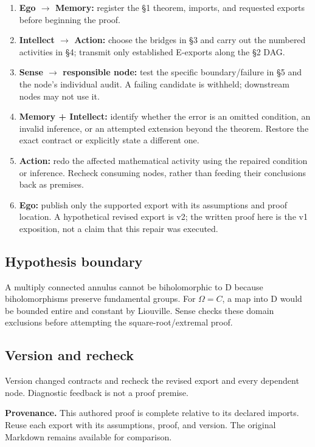 \documentclass[preprint,12pt,aps,pra,showkeys,amsmath,amssymb,superscriptaddress,floatfix]{revtex4-2}
\theoremstyle{definition}
\theoremstyle{remark}
\providecommand{\tightlist}{\setlength{\itemsep}{2pt}\setlength{\parskip}{0pt}}
\begin{document}
\begin{enumerate}
\def\labelenumi{\arabic{enumi}.}
\tightlist
\item
  \textbf{Ego \(\to\) Memory:} register the §1 theorem, imports, and
  requested exports before beginning the proof.
\item
  \textbf{Intellect \(\to\) Action:} choose the bridges in §3 and carry
  out the numbered activities in §4; transmit only established E-exports
  along the §2 DAG.
\item
  \textbf{Sense \(\to\) responsible node:} test the specific
  boundary/failure in §5 and the node's individual audit. A failing
  candidate is withheld; downstream nodes may not use it.
\item
  \textbf{Memory + Intellect:} identify whether the error is an omitted
  condition, an invalid inference, or an attempted extension beyond the
  theorem. Restore the exact contract or explicitly state a different
  one.
\item
  \textbf{Action:} redo the affected mathematical activity using the
  repaired condition or inference. Recheck consuming nodes, rather than
  feeding their conclusions back as premises.
\item
  \textbf{Ego:} publish only the supported export with its assumptions
  and proof location. A hypothetical revised export is v2; the written
  proof here is the v1 exposition, not a claim that this repair was
  executed.
\end{enumerate}

\subsection{Hypothesis boundary}
A multiply connected annulus cannot be biholomorphic to D because
biholomorphisms preserve fundamental groups. For \(\Omega =C\), a map
into D would be bounded entire and constant by Liouville. Sense checks
these domain exclusions before attempting the square-root/extremal
proof.

\subsection{Version and recheck}
Version changed contracts and recheck the revised export and every
dependent node. Diagnostic feedback is not a proof premise.

\par\medskip\begingroup\footnotesize\linespread{1.0}\selectfont\noindent\textbf{Provenance.} This authored proof is complete relative to its declared imports. Reuse
each export with its assumptions, proof, and version. The original
Markdown remains available for comparison.
\par\endgroup
\end{document}
